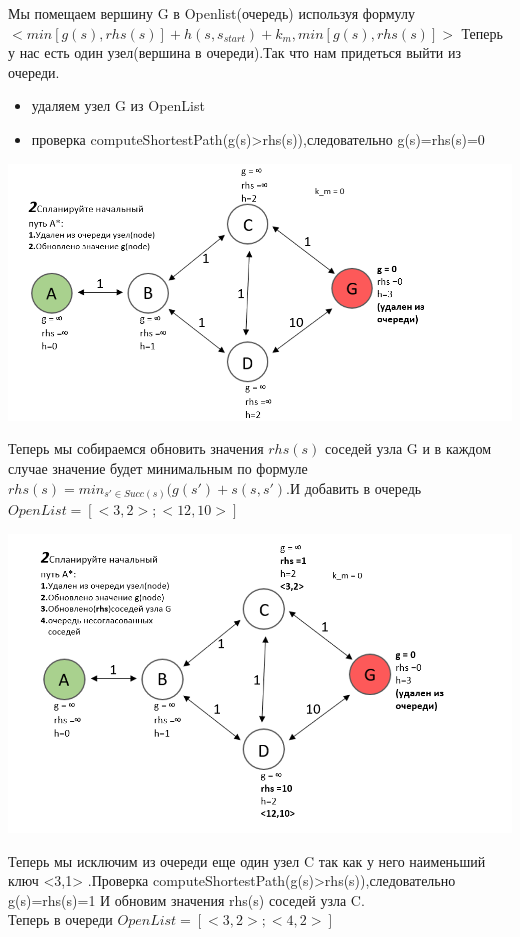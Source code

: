 \documentclass[12pt]{article}
\begin{document}
Мы помещаем вершину G в Openlist(очередь) используя формулу\\
$<min[g(s),rhs(s)]+h(s,s_{start})+k_m,min[g(s),rhs(s)]>$
Теперь у нас есть один узел(вершина в очереди).Так что нам придеться выйти из очереди.
\begin{itemize}
    \item удаляем узел G из OpenList
    \item проверка computeShortestPath(g(s)>rhs(s)),следовательно g(s)=rhs(s)=0
\end{itemize}
\begin{center}
        \includegraphics[width=1\textwidth]{img/example2.png}
    \end{center}    
Теперь мы собираемся обновить значения $rhs(s)$ соседей узла G  и в каждом случае значение будет минимальным по формуле $rhs(s)=min_{s'\in Succ(s)}(g(s')+s(s,s')$.И добавить в очередь $OpenList=[<3,2>;<12,10>]$
\begin{center}
        \includegraphics[width=1\textwidth]{img/example2_1.png}
    \end{center}
\newpage
Теперь мы исключим из очереди еще один узел C так как у него наименьший ключ <3,1> .Проверка computeShortestPath(g(s)>rhs(s)),следовательно g(s)=rhs(s)=1 И обновим значения rhs(s) соседей узла C.\\Теперь в очереди $OpenList=[<3,2>;<4,2>]$
\end{document}
